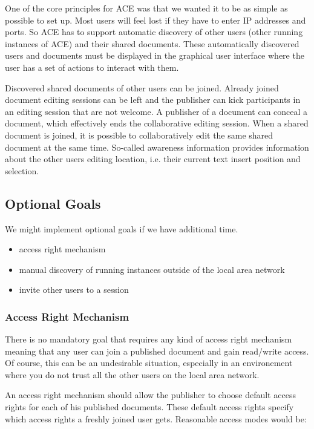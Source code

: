 \documentclass[11pt,a4paper]{article}
\begin{document}
One of the core principles for ACE was that we wanted it to be as simple as possible to set up. Most users
will feel lost if they have to enter IP addresses and ports. So ACE has to support automatic discovery
of other users (other running instances of ACE) and their shared documents. These automatically discovered
users and documents must be displayed in the graphical user interface where the user has a set of actions
to interact with them.

Discovered shared documents of other users can be joined. Already joined document editing sessions can
be left and the publisher can kick participants in an editing session that are not welcome. A
publisher of a document can conceal a document, which effectively ends the collaborative editing
session. When a shared
document is joined, it is possible to collaboratively edit the same shared document at the same time. 
So-called awareness information provides information about the other users editing location, i.e. their
current text insert position and selection.


\subsection{Optional Goals}

We might implement optional goals if we have additional time.

\begin{itemize}
 \item access right mechanism
 \item manual discovery of running instances outside of the local area network
 \item invite other users to a session 
\end{itemize}

\subsubsection{Access Right Mechanism}

There is no mandatory goal that requires any kind of access right mechanism 
meaning that any user can join a published document and gain read/write 
access. Of course, this can be an undesirable situation, especially in an 
environement where you do not trust all the other users on the local 
area network.

An access right mechanism should allow the publisher to choose default access 
rights for each of his published documents. These default access rights 
specify which access rights a freshly joined user gets. Reasonable access 
modes would be:
\end{document}
